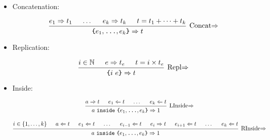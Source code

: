\documentclass{article}
\renewcommand{\S}{\ensuremath{\Rightarrow}}
\newcommand{\C}{\ensuremath{\Leftarrow}}
\newcommand{\s}[2]{#1 \S{} #2}
\renewcommand{\c}[2]{#1 \C{} #2}
\begin{document}
\begin{itemize}[leftmargin=*]
    \item Concatenation:

          \begin{equation*}
              \begin{prooftree}
                  \hypo{\s{e_1}{t_1}}
                  \hypo{\dots}
                  \hypo{\s{e_k}{t_k}}
                  \hypo{t = t_1 + \cdots + t_k}
                  \infer4[Concat\S]{\s{\texttt{\{}e_1, \texttt{\dots}, e_k \texttt{\}}}{t}}
              \end{prooftree}
          \end{equation*}


    \item Replication:

          \begin{equation*}
              \begin{prooftree}
                  \hypo{i \in \mathbb{N}}
                  \hypo{\s{e}{t_e}}
                  \hypo{t = i \times t_e}
                  \infer3[Repl\S]{\s{\texttt{\{}i~e\texttt{\}}}{t}}
              \end{prooftree}
          \end{equation*}


    \item Inside:

          \begin{gather*}
              \begin{prooftree}
                  \hypo{\s{a}{t}}
                  \hypo{\c{e_1}{t}}
                  \hypo{\dots}
                  \hypo{\c{e_k}{t}}
                  \infer4[LInside\S]{\s{a~\texttt{inside}~\texttt{\{}e_1, \texttt{\dots}, e_k \texttt{\}}}{1}}
              \end{prooftree}
              \\[1em]
              \begin{prooftree}
                  \hypo{i \in \{1, \dots, k\}}
                  \hypo{\c{a}{t}}
                  \hypo{\c{e_1}{t}}
                  \hypo{\dots}
                  \hypo{\c{e_{i-1}}{t}}
                  \hypo{\s{e_i}{t}}
                  \hypo{\c{e_{i+1}}{t}}
                  \hypo{\dots}
                  \hypo{\c{e_k}{t}}
                  \infer9[RInside\S]{\s{a~\texttt{inside}~\texttt{\{}e_1, \texttt{\dots}, e_k \texttt{\}}}{1}}
              \end{prooftree}
          \end{gather*}
\end{itemize}
\end{document}
